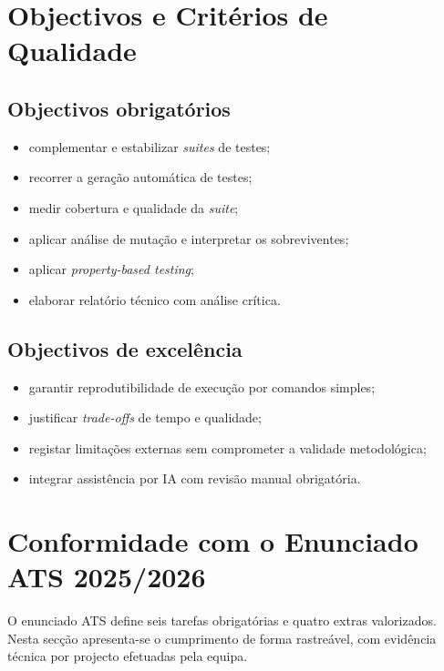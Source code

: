 \documentclass{article}
\begin{document}
\section{Objectivos e Critérios de Qualidade}

\subsection{Objectivos obrigatórios}
\begin{itemize}
    \item complementar e estabilizar \emph{suites} de testes;
    \item recorrer a geração automática de testes;
    \item medir cobertura e qualidade da \emph{suite};
    \item aplicar análise de mutação e interpretar os sobreviventes;
    \item aplicar \emph{property-based testing};
    \item elaborar relatório técnico com análise crítica.
\end{itemize}

\subsection{Objectivos de excelência}
\begin{itemize}
    \item garantir reprodutibilidade de execução por comandos simples;
    \item justificar \emph{trade-offs} de tempo e qualidade;
    \item registar limitações externas sem comprometer a validade metodológica;
    \item integrar assistência por IA com revisão manual obrigatória.
\end{itemize}

\section{Conformidade com o Enunciado ATS 2025/2026}

O enunciado ATS define seis tarefas obrigatórias e quatro extras valorizados. Nesta secção apresenta-se o cumprimento de forma rastreável, com evidência técnica por projecto efetuadas pela equipa.
\end{document}
